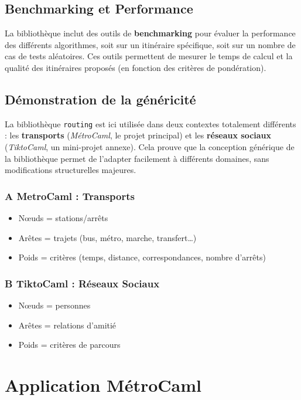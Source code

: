 \documentclass[12pt,a4paper]{article}
\begin{document}
\subsection{Benchmarking et Performance}

La bibliothèque inclut des outils de \textbf{benchmarking} pour évaluer la performance des différents algorithmes, soit sur un itinéraire spécifique, soit sur un nombre de cas de tests aléatoires. Ces outils permettent de mesurer le temps de calcul et la qualité des itinéraires proposés (en fonction des critères de pondération).
\newpage
\subsection{Démonstration de la généricité}

La bibliothèque \texttt{routing} est ici utilisée dans deux contextes totalement différents : les \textbf{transports} (\textit{MétroCaml}, le projet principal) et les \textbf{réseaux sociaux} (\textit{TiktoCaml}, un mini-projet annexe). Cela prouve que la conception générique de la bibliothèque permet de l'adapter facilement à différents domaines, sans modifications structurelles majeures.

\subsubsection*{A \textbar{} MetroCaml : Transports}
\begin{itemize}
    \item N\oe{}uds = stations/arrêts
    \item Arêtes = trajets (bus, métro, marche, transfert\ldots)
    \item Poids  = critères (temps, distance, correspondances, nombre d'arrêts)
\end{itemize}

\subsubsection*{B \textbar{} TiktoCaml : Réseaux Sociaux}
\begin{itemize}
    \item N\oe{}uds = personnes
    \item Arêtes = relations d'amitié
    \item Poids  = critères de parcours
\end{itemize}

\section{Application MétroCaml}
\end{document}
